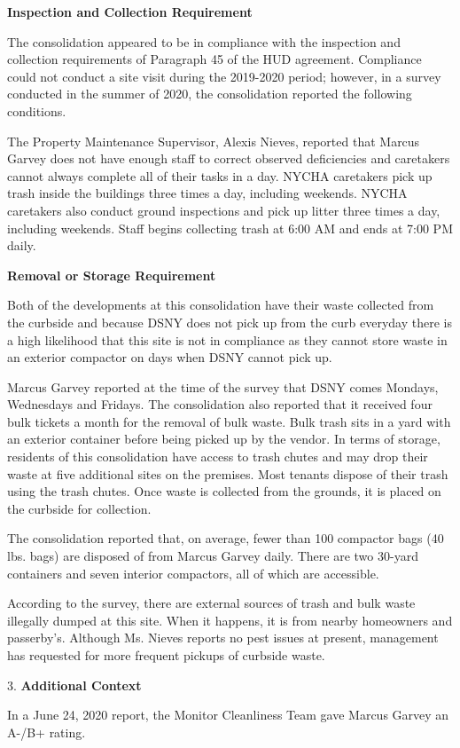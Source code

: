 
\textbf{Inspection and Collection Requirement}

The consolidation appeared to be in compliance with the inspection and collection requirements of Paragraph 45 of the HUD agreement. Compliance could not conduct a site visit during the 2019-2020 period; however, in a survey conducted in the summer of 2020, the consolidation reported the following conditions.

The Property Maintenance Supervisor, Alexis Nieves, reported that Marcus Garvey does not have enough staff to correct observed deficiencies and caretakers cannot always complete all of their tasks in a day. NYCHA caretakers pick up trash inside the buildings three times a day, including weekends. NYCHA caretakers also conduct ground inspections and pick up litter three times a day, including weekends. Staff begins collecting trash at 6:00 AM and ends at 7:00 PM daily.

\textbf{Removal or Storage Requirement}

Both of the developments at this consolidation have their waste collected from the curbside and because DSNY does not pick up from the curb everyday there is a high likelihood that this site is not in compliance as they cannot store waste in an exterior compactor on days when DSNY cannot pick up.

Marcus Garvey reported at the time of the survey that DSNY comes Mondays, Wednesdays and Fridays. The consolidation also reported that it received four bulk tickets a month for the removal of bulk waste. Bulk trash sits in a yard with an exterior container before being picked up by the vendor. In terms of storage, residents of this consolidation have access to trash chutes and may drop their waste at five additional sites on the premises. Most tenants dispose of their trash using the trash chutes. Once waste is collected from the grounds, it is placed on the curbside for collection. 

The consolidation reported that, on average, fewer than 100 compactor bags (40 lbs. bags) are disposed of from Marcus Garvey daily. There are two 30-yard containers and seven interior compactors, all of which are accessible. 

According to the survey, there are external sources of trash and bulk waste illegally dumped at this site. When it happens, it is from nearby homeowners and passerby's. Although Ms. Nieves reports no pest issues at present, management has requested for more frequent pickups of curbside waste. 

3. \textbf{Additional Context} 

In a June 24, 2020 report, the Monitor Cleanliness Team gave Marcus Garvey an A-/B+ rating. 